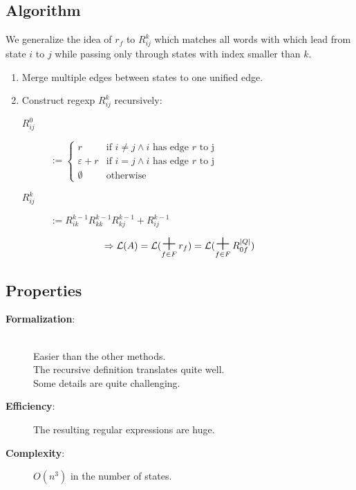 \documentclass{beamer}
\DeclareMathOperator*{\bigplus}{\mbox{\huge +}}
\begin{document}
\subsection*{Algorithm}
\begin{frame}

    We generalize the idea of $r_f$ to $R^k_{i j}$ which matches all words with which lead from state $i$ to $j$ while passing only through states with index smaller than $k$.

    \begin{enumerate}
        \item 
            Merge multiple edges between states to one unified edge.
        \item
            Construct regexp $R^k_{i j}$ recursively:

            \begin{description}

                \item[$R^0_{i j}$]
                    $ := \begin{cases} 
                        r & \mbox{if } i \neq j \wedge i \mbox{ has edge } r \mbox{ to j}  \\
          \varepsilon + r & \mbox{if } i = j \wedge i \mbox{ has edge } r \mbox{ to j}  \\
                \emptyset & \mbox{otherwise}
                    \end{cases}
                    $ 

                \item[$R^k_{i j}$]
                    $ := R^{k-1}_{i k} R^{k-1}_{k k} R^{k-1}_{k j} + R^{k-1}_{i j}$

            \end{description}

    \end{enumerate}

    \[ 
    \Rightarrow \mathcal{L}(A) = \mathcal{L}(\bigplus_{f \in F} r_f) = \mathcal{L}(\bigplus_{f \in F} R^{|Q|}_{0 f}) 
    \]

\end{frame}

\subsection*{Properties}
\begin{frame}
    \begin{description}
        \item[\textbf{Formalization}:] \hfill \\
            Easier than the other methods.\\
            The recursive definition translates quite well.\\
            Some details are quite challenging.

        \item[\textbf{Efficiency}:] The resulting regular expressions are huge.

        \item[\textbf{Complexity}:]
            $O(n^3)$ in the number of states.
    \end{description}
\end{frame}
\end{document}
